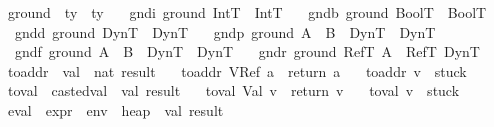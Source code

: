 \begin{isabellebody}
\isanewline
{}\isamarkupfalse \ ground\ {\isacharcolon}{\isacharcolon}\ {\isachardoublequoteopen}ty\ {\isasymRightarrow}\ ty{\isachardoublequoteclose}\ \isanewline
\ \ gndi{\isacharcolon}\ {\isachardoublequoteopen}ground\ IntT\ {\isacharequal}\ IntT{\isachardoublequoteclose}\ {\isacharbar}\isanewline
\ \ gndb{\isacharcolon}\ {\isachardoublequoteopen}ground\ BoolT\ {\isacharequal}\ BoolT{\isachardoublequoteclose}\ {\isacharbar}\isanewline
\ \ gndd{\isacharcolon}\ {\isachardoublequoteopen}ground\ DynT\ {\isacharequal}\ DynT{\isachardoublequoteclose}\ {\isacharbar}\isanewline
\ \ gndp{\isacharcolon}\ {\isachardoublequoteopen}ground\ {\isacharparenleft}A\ {\isasymtimes}\ B{\isacharparenright}\ {\isacharequal}\ {\isacharparenleft}DynT\ {\isasymtimes}\ DynT{\isacharparenright}{\isachardoublequoteclose}\ {\isacharbar}\isanewline
\ \ gndf{\isacharcolon}\ {\isachardoublequoteopen}ground\ {\isacharparenleft}A\ {\isasymrightarrow}\ B{\isacharparenright}\ {\isacharequal}\ {\isacharparenleft}DynT\ {\isasymrightarrow}\ DynT{\isacharparenright}{\isachardoublequoteclose}\ {\isacharbar}\isanewline
\ \ gndr{\isacharcolon}\ {\isachardoublequoteopen}ground\ {\isacharparenleft}RefT\ A{\isacharparenright}\ {\isacharequal}\ RefT\ DynT{\isachardoublequoteclose}\isanewline
\isanewline
{}\isamarkupfalse \ to{\isacharunderscore}addr\ {\isacharcolon}{\isacharcolon}\ {\isachardoublequoteopen}val\ {\isasymRightarrow}\ nat\ result{\isachardoublequoteclose}\ \isanewline
\ \ {\isachardoublequoteopen}to{\isacharunderscore}addr\ {\isacharparenleft}VRef\ a{\isacharparenright}\ {\isacharequal}\ return\ a{\isachardoublequoteclose}\ {\isacharbar}\isanewline
\ \ {\isachardoublequoteopen}to{\isacharunderscore}addr\ v\ {\isacharequal}\ stuck{\isachardoublequoteclose}\isanewline
\isanewline
{}\isamarkupfalse \ to{\isacharunderscore}val\ {\isacharcolon}{\isacharcolon}\ {\isachardoublequoteopen}casted{\isacharunderscore}val\ {\isasymRightarrow}\ val\ result{\isachardoublequoteclose}\ \isanewline
\ \ {\isachardoublequoteopen}to{\isacharunderscore}val\ {\isacharparenleft}Val\ v{\isacharparenright}\ {\isacharequal}\ return\ v{\isachardoublequoteclose}\ {\isacharbar}\isanewline
\ \ {\isachardoublequoteopen}to{\isacharunderscore}val\ v\ {\isacharequal}\ stuck{\isachardoublequoteclose}\isanewline
\isanewline
{}\isamarkupfalse \ eval\ {\isacharcolon}{\isacharcolon}\ {\isachardoublequoteopen}expr\ {\isasymRightarrow}\ env\ {\isasymRightarrow}\ heap\ {\isasymRightarrow}\ val\ result{\isachardoublequoteclose}\ \isanewline

\end{isabellebody}
